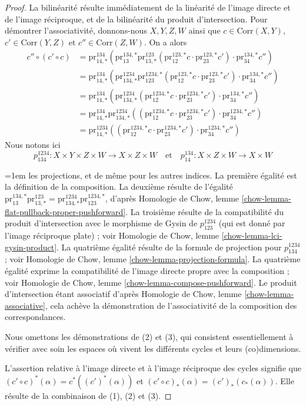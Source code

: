 \begin{proof}
La bilinéarité résulte immédiatement de la linéarité de l'image directe
et de l'image réciproque, et de la bilinéarité du produit d'intersection.
Pour démontrer l'associativité, donnons-nous
$X, Y, Z, W$ ainsi que $c \in \text{Corr}(X, Y)$, $c' \in \text{Corr}(Y, Z)$ et
$c'' \in \text{Corr}(Z, W)$. On a alors
\begin{align*}
c'' \circ (c' \circ c)
& =
\text{pr}^{134}_{14, *}(
\text{pr}^{134, *}_{13}
\text{pr}^{123}_{13, *}(\text{pr}^{123, *}_{12}c \cdot
\text{pr}^{123, *}_{23}c')
\cdot \text{pr}^{134, *}_{34}c'') \\
& =
\text{pr}^{134}_{14, *}(
\text{pr}^{1234}_{134, *}
\text{pr}^{1234, *}_{123}(\text{pr}^{123, *}_{12}c \cdot
\text{pr}^{123, *}_{23}c')
\cdot \text{pr}^{134, *}_{34}c'') \\
& =
\text{pr}^{134}_{14, *}(
\text{pr}^{1234}_{134, *}
(\text{pr}^{1234, *}_{12}c \cdot
\text{pr}^{1234, *}_{23}c')
\cdot \text{pr}^{134, *}_{34}c'') \\
& =
\text{pr}^{134}_{14, *}
\text{pr}^{1234}_{134, *}
((\text{pr}^{1234, *}_{12}c \cdot
\text{pr}^{1234, *}_{23}c')
\cdot \text{pr}^{1234, *}_{34}c'') \\
& =
\text{pr}^{1234}_{14, *}(
(\text{pr}^{1234, *}_{12}c \cdot
\text{pr}^{1234, *}_{23}c') \cdot
\text{pr}^{1234, *}_{34}c'')
\end{align*}
Nous notons ici
$$
p^{1234}_{134} : X \times Y \times Z \times W \to X \times Z \times W
\quad\text{et}\quad
p^{134}_{14} : X \times Z \times W \to X \times W
$$
{\emergencystretch=1em les projections, et de même pour les autres indices.
La première égalité est la définition de la composition.
La deuxième résulte de l'égalité
$\text{pr}^{134, *}_{13} \text{pr}^{123}_{13, *} =
\text{pr}^{1234}_{134, *} \text{pr}^{1234, *}_{123}$,
d'après Homologie de Chow, lemme \ref{chow-lemma-flat-pullback-proper-pushforward}.
La troisième résulte de la compatibilité du produit d'intersection
avec le morphisme de Gysin de $p^{1234}_{123}$ (qui est donné par l'image réciproque plate) ; voir
Homologie de Chow, lemme \ref{chow-lemma-lci-gysin-product}.
La quatrième égalité résulte de la formule de projection pour
$p^{1234}_{134}$ ; voir Homologie de Chow, lemme \ref{chow-lemma-projection-formula}.
La quatrième égalité exprime la compatibilité de l'image directe propre
avec la composition ; voir Homologie de Chow, lemme \ref{chow-lemma-compose-pushforward}.
Le produit d'intersection étant associatif d'après
Homologie de Chow, lemme \ref{chow-lemma-associative},
cela achève la démonstration de l'associativité de la composition des correspondances.\par}

\medskip\noindent
Nous omettons les démonstrations de (2) et (3), qui consistent essentiellement
à vérifier avec soin les espaces où vivent les différents cycles et leurs (co)dimensions.

\medskip\noindent
L'assertion relative à l'image directe et à l'image réciproque des cycles
signifie que $(c' \circ c)^*(\alpha) = c^*((c')^*(\alpha))$ et
$(c' \circ c)_*(\alpha) = (c')_*(c_*(\alpha))$.
Elle résulte de la combinaison de (1), (2) et (3).
\end{proof}

